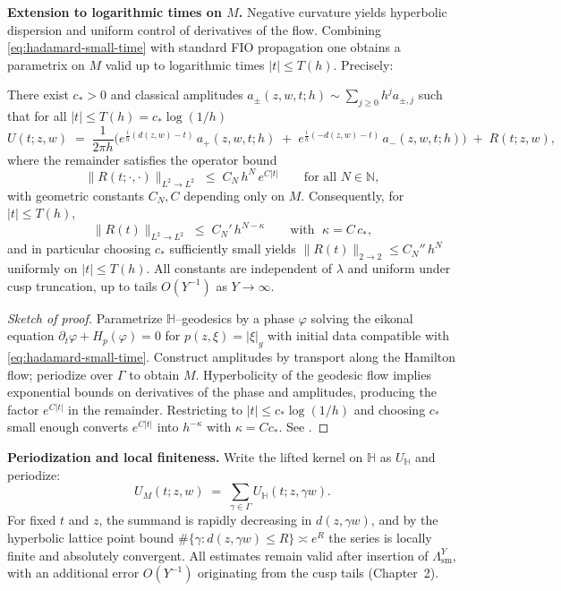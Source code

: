 \medskip

\noindent\textbf{Extension to logarithmic times on $M$.}
Negative curvature yields hyperbolic dispersion and uniform control of derivatives of the flow.
Combining \eqref{eq:hadamard-small-time} with standard FIO propagation
one obtains a parametrix on $M$ valid up to logarithmic times $|t|\le T(h)$.
Precisely:

\begin{theorem}\label{thm:parametrix-logtime}
There exist $c_{*}>0$ and classical amplitudes $a_{\pm}(z,w,t;h)\sim\sum_{j\ge 0}h^{j}a_{\pm,j}$
such that for all $|t|\le T(h)=c_{*}\log(1/h)$
\begin{equation}\label{eq:parametrix-log}
U(t;z,w)\;=\;\frac{1}{2\pi h}\Big(e^{\frac{i}{h}(d(z,w)-t)}\,a_{+}(z,w,t;h)\;+\;
e^{\frac{i}{h}(-d(z,w)-t)}\,a_{-}(z,w,t;h)\Big)\;+\;R(t;z,w),
\end{equation}
where the remainder satisfies the operator bound
\[
\|R(t;\cdot,\cdot)\|_{L^{2}\to L^{2}}\;\le\;C_{N}\,h^{N}\,e^{C|t|}\qquad\text{for all }N\in\mathbb{N},
\]
with geometric constants $C_{N},C$ depending only on $M$.
Consequently, for $|t|\le T(h)$,
\[
\|R(t)\|_{L^{2}\to L^{2}}\;\le\;C_{N}'\,h^{N-\kappa}\qquad\text{with }\;\kappa=C\,c_{*},
\]
and in particular choosing $c_{*}$ sufficiently small yields
$\|R(t)\|_{2\to 2}\le C_{N}''\,h^{N}$ uniformly on $|t|\le T(h)$.
All constants are independent of $\lambda$ and uniform under cusp truncation,
up to tails $O(Y^{-1})$ as $Y\to\infty$.
\end{theorem}

\begin{proof}[Sketch of proof]
Parametrize $\mathbb{H}$–geodesics by a phase $\varphi$ solving the eikonal equation
$\partial_{t}\varphi+H_{p}(\varphi)=0$ for $p(z,\xi)=|\xi|_{g}$ with initial data compatible
with \eqref{eq:hadamard-small-time}.
Construct amplitudes by transport along the Hamilton flow; periodize over $\Gamma$ to obtain $M$.
Hyperbolicity of the geodesic flow implies exponential bounds on derivatives of the phase and
amplitudes, producing the factor $e^{C|t|}$ in the remainder.
Restricting to $|t|\le c_{*}\log(1/h)$ and choosing $c_{*}$ small enough converts
$e^{C|t|}$ into $h^{-\kappa}$ with $\kappa=Cc_{*}$.
See \cite{DG1975,Hormander1994,Zworski2012,Berard1977,DyatlovZworski2019}.
\end{proof}

\medskip

\noindent\textbf{Periodization and local finiteness.}
Write the lifted kernel on $\mathbb{H}$ as $U_{\mathbb{H}}$ and periodize:
\[
U_{M}(t;z,w)\;=\;\sum_{\gamma\in\Gamma}U_{\mathbb{H}}(t;z,\gamma w).
\]
For fixed $t$ and $z$, the summand is rapidly decreasing in $d(z,\gamma w)$,
and by the hyperbolic lattice point bound
$\#\{\gamma: d(z,\gamma w)\le R\}\asymp e^{R}$ the series is locally finite and absolutely convergent.
All estimates remain valid after insertion of $\Lambda^{Y}_{\mathrm{sm}}$,
with an additional error $O(Y^{-1})$ originating from the cusp tails (Chapter~2).

